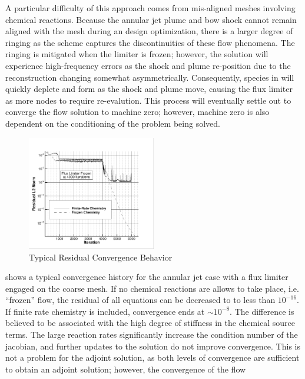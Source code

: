 A particular difficulty of this approach comes from mis-aligned meshes involving
chemical reactions.  Because the annular jet plume and bow shock cannot remain
aligned with the mesh during an design optimization, there is a larger degree of
ringing as the scheme captures the discontinuities of these flow phenomena.  The
ringing is mitigated when the limiter is frozen; however, the solution will
experience high-frequency errors as the shock and plume re-position due to the
reconstruction changing somewhat asymmetrically.  Consequently, species in will
quickly deplete and form as the shock and plume move, causing the flux limiter
as more nodes to require re-evalution.  This process will eventually settle out
to converge the flow solution to machine zero; however, machine zero is also
dependent on the conditioning of the problem being solved.  
\begin{figure}[h]
  \centering
  \includegraphics[width=0.5\textwidth]{figures/limiters/chem-res-comp.png}
  \caption{Typical Residual Convergence Behavior}
  \label{fig:chem-res-comp}
\end{figure}
 shows a typical convergence history for the annular jet
case with a flux limiter engaged on the coarse mesh.  If no chemical reactions
are allows to take place, i.e. ``frozen'' flow, the residual of all equations
can be decreased to to less than $10^{-16}$.  If finite rate chemistry is
included, convergence ends at $\sim 10^{-8}$.  The difference is believed to be
associated with the high degree of stiffness in the chemical source terms.  The
large reaction rates significantly increase the condition number of the
jacobian, and further updates to the solution do not improve convergence.  This
is not a problem for the adjoint solution, as both levels of convergence are
sufficient to obtain an adjoint solution; however, the convergence of the flow

